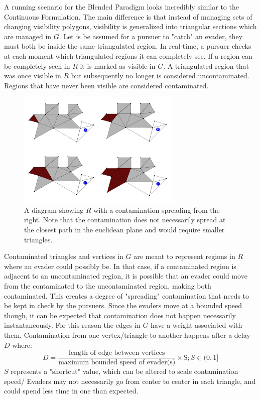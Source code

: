\documentclass{article}
\begin{document}
A running scenario for the Blended Paradigm looks incredibly similar to the Continuous Formulation. The main difference is that instead of managing sets of changing visibility polygons, visibility is generalized into triangular sections which are managed in \(G\). Let is be assumed for a pursuer to "catch" an evader, they must both be inside the same triangulated region. In real-time, a pursuer checks at each moment which triangulated regions it can completely see. If a region can be completely seen in \(R\) it is marked as visible in \(G\). A triangulated region that was once visible in \(R\) but subsequently no longer is considered uncontaminated. Regions that have never been visible are considered contaminated. 

\begin{figure}[htb]
\centering
\includegraphics[width=0.7\textwidth]{"contamination"}
\caption{A diagram showing \(R\) with a contamination spreading from the right. Note that the contamination does not necessarily spread at the closest path in the euclidean plane and would require smaller triangles.}
\end{figure}

Contaminated triangles and vertices in \(G\) are meant to represent regions in \(R\) where an evader could possibly be. In that case, if a contaminated region is adjacent to an uncontaminated region, it is possible that an evader could move from the contaminated to the uncontaminated region, making both contaminated. This creates a degree of "spreading" contamination that needs to be kept in check by the pursuers. Since the evaders move at a bounded speed though, it can be expected that contamination does not happen necessarily instantaneously. For this reason the edges in \(G\) have a weight associated with them. Contamination from one vertex/triangle to another happens after a delay \(D\) where: \begin{displaymath}
D = \frac{\text{length of edge between vertices}}{\text{maximum bounded speed of evader(s)}}\times \text{S} ; S\in(0,1]
\end{displaymath}\(S\) represents a "shortcut" value, which can be altered to scale contamination speed/ Evaders may not necessarily go from center to center in each triangle, and could spend less time in one than expected.
\end{document}
